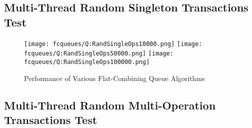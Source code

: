 \subsection{Multi-Thread Random Singleton Transactions Test}
\begin{figure}[ht!]
\centering
\texttt{[image: fcqueues/Q:RandSingleOps10000.png]}
\texttt{[image: fcqueues/Q:RandSingleOps50000.png]}
\texttt{[image: fcqueues/Q:RandSingleOps100000.png]}
\caption{Performance of Various Flat-Combining Queue Algorithms}
\label{fig:txnal_queues}
\end{figure}
\fi
\subsection{Multi-Thread Random Multi-Operation Transactions Test}
